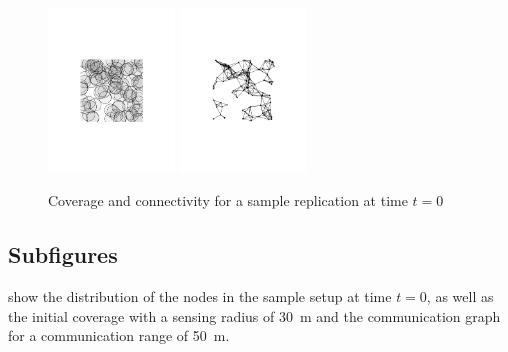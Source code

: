 \begin{figure}
	\centering
	\includegraphics[width=0.3\textwidth]{figures/coverage-30--0-static1}
	\includegraphics[width=0.3\textwidth]{figures/connectivity-50-0-static1}
	\caption{Coverage and connectivity for a sample replication at time $t=0$}
	\label{fig:setup0}
\end{figure}

\subsection{Subfigures}

 show the distribution of the nodes in the sample setup at time $t=0$, as well as the initial coverage with a sensing radius of \SI{30}{\metre} and the communication graph for a communication range of \SI{50}{\metre}.

